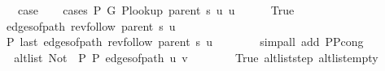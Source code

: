 \begin{isabellebody}
\ \ \isamarkupfalse%
\ {}\isanewline
\ \ \isamarkupfalse%
\ {\isacharquery}{\kern0pt}case\isanewline
\ \ \isamarkupfalse%
\ {\isacharparenleft}{\kern0pt}cases\ {\isachardoublequoteopen}P{\isacharprime}{\kern0pt}\ G{}\ {\isacharparenleft}{\kern0pt}P{\isacharunderscore}{\kern0pt}lookup\ {\isacharparenleft}{\kern0pt}parent\ s{\isacharparenright}{\kern0pt}\ u{\isacharparenright}{\kern0pt}\ u{\isachardoublequoteclose}{\isacharparenright}{\kern0pt}\isanewline
\ \ \ \ \isamarkupfalse%
\ True\isanewline
\ \ \ \ \isamarkupfalse%
\isanewline
\ \ \ \ \ \ {\isachardoublequoteopen}edges{\isacharunderscore}{\kern0pt}of{\isacharunderscore}{\kern0pt}path\ {\isacharparenleft}{\kern0pt}rev{\isacharunderscore}{\kern0pt}follow\ {\isacharparenleft}{\kern0pt}parent\ s{\isacharparenright}{\kern0pt}\ u{\isacharparenright}{\kern0pt}\ {\isasymnoteq}\ {\isacharbrackleft}{\kern0pt}{\isacharbrackright}{\kern0pt}{\isachardoublequoteclose}\isanewline
\ \ \ \ \ \ {\isachardoublequoteopen}P{\isacharprime}{\kern0pt}{\isacharprime}{\kern0pt}\ {\isacharparenleft}{\kern0pt}last\ {\isacharparenleft}{\kern0pt}edges{\isacharunderscore}{\kern0pt}of{\isacharunderscore}{\kern0pt}path\ {\isacharparenleft}{\kern0pt}rev{\isacharunderscore}{\kern0pt}follow\ {\isacharparenleft}{\kern0pt}parent\ s{\isacharparenright}{\kern0pt}\ u{\isacharparenright}{\kern0pt}{\isacharparenright}{\kern0pt}{\isacharparenright}{\kern0pt}{\isachardoublequoteclose}\isanewline
\ \ \ \ \ \ \isamarkupfalse%
\ {\isacharparenleft}{\kern0pt}simp{\isacharunderscore}{\kern0pt}all\ add{\isacharcolon}{\kern0pt}\ P{\isacharprime}{\kern0pt}{\isacharunderscore}{\kern0pt}P{\isacharprime}{\kern0pt}{\isacharprime}{\kern0pt}{\isacharunderscore}{\kern0pt}cong{\isacharparenright}{\kern0pt}\isanewline
\ \ \ \ \isamarkupfalse%
\ \isamarkupfalse%
\ {\isachardoublequoteopen}alt{\isacharunderscore}{\kern0pt}list\ {\isacharparenleft}{\kern0pt}Not\ {\isasymcirc}\ P{\isacharprime}{\kern0pt}{\isacharprime}{\kern0pt}{\isacharparenright}{\kern0pt}\ P{\isacharprime}{\kern0pt}{\isacharprime}{\kern0pt}\ {\isacharparenleft}{\kern0pt}edges{\isacharunderscore}{\kern0pt}of{\isacharunderscore}{\kern0pt}path\ {\isacharbrackleft}{\kern0pt}u{\isacharcomma}{\kern0pt}\ v{\isacharbrackright}{\kern0pt}{\isacharparenright}{\kern0pt}{\isachardoublequoteclose}\isanewline
\ \ \ \ \ \ \isamarkupfalse%
\ True\ alt{\isacharunderscore}{\kern0pt}list{\isacharunderscore}{\kern0pt}step\ alt{\isacharunderscore}{\kern0pt}list{\isacharunderscore}{\kern0pt}empty\isanewline

\end{isabellebody}

